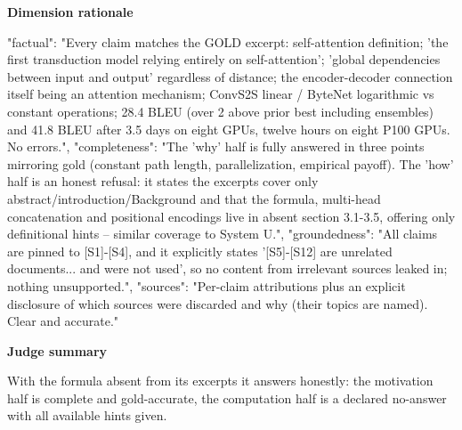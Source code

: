 \documentclass[10pt]{article}
\begin{document}
\textbf{Dimension rationale}
\begin{EvidenceText}
{
  "factual": "Every claim matches the GOLD excerpt: self-attention definition; 'the first transduction model relying entirely on self-attention'; 'global dependencies between input and output' regardless of distance; the encoder-decoder connection itself being an attention mechanism; ConvS2S linear / ByteNet logarithmic vs constant operations; 28.4 BLEU (over 2 above prior best including ensembles) and 41.8 BLEU after 3.5 days on eight GPUs, twelve hours on eight P100 GPUs. No errors.",
  "completeness": "The 'why' half is fully answered in three points mirroring gold (constant path length, parallelization, empirical payoff). The 'how' half is an honest refusal: it states the excerpts cover only abstract/introduction/Background and that the formula, multi-head concatenation and positional encodings live in absent section 3.1-3.5, offering only definitional hints -- similar coverage to System U.",
  "groundedness": "All claims are pinned to [S1]-[S4], and it explicitly states '[S5]-[S12] are unrelated documents... and were not used', so no content from irrelevant sources leaked in; nothing unsupported.",
  "sources": "Per-claim attributions plus an explicit disclosure of which sources were discarded and why (their topics are named). Clear and accurate."
}
\end{EvidenceText}

\textbf{Judge summary}
\begin{EvidenceText}
With the formula absent from its excerpts it answers honestly: the motivation half is complete and gold-accurate, the computation half is a declared no-answer with all available hints given.
\end{EvidenceText}
\end{document}
